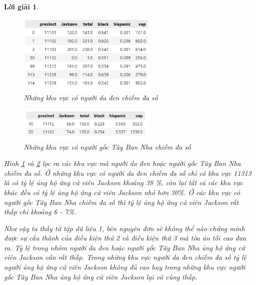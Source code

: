 \documentclass[14pt, a4paper]{article}
\theoremstyle{sltheorem}
\theoremstyle{soltheorem}
\newtheorem*{loigiai}{Lời giải}
\begin{document}
\begin{loigiai}
\begin{enumerate}
    \begin{figure}[H]
        \centering
        \includegraphics[width=0.6\textwidth]{figures/Predominant_black.png}
        \caption{Những khu vực có người da đen chiếm đa số}
        \label{fig:Predominant_black}
    \end{figure}

    \begin{figure}[H]
        \centering
        \includegraphics[width=0.6\textwidth]{figures/Predominant_hispanic.png}
        \caption{Những khu vực có người gốc Tây Ban Nha chiếm đa số}
        \label{fig:Predominant_hispanic}
    \end{figure}

    Hình \ref{fig:Predominant_black} và \ref{fig:Predominant_hispanic} lọc ra các khu vực mà người da đen hoặc người gốc Tây Ban Nha chiếm đa số.
    Ở những khu vực có người da đen chiếm đa số chỉ có khu vực 11313 là có tỷ lệ ủng hộ ứng cử viên Jackson khoảng 38 \%, còn lại tất cả các khu vực khác đều có tỷ lệ ủng hộ ứng cử viên Jackson nhỏ hơn 30\%.
    Ở các khu vực có người gốc Tây Ban Nha chiếm đa số thì tỷ lệ ủng hộ ứng cử viên Jackson rất thấp chỉ khoảng 6 - 7\%.

    Như vậy ta thấy từ tập dữ liệu 1, bên nguyên đơn sẽ không thể nào chứng minh được sự cấu thành của điều kiện thứ 2 và điều kiện thứ 3 mà tòa án tối cao đưa ra.
    Tỷ lệ trong nhóm người da đen hoặc người gốc Tây Ban Nha ủng hộ ứng cứ viên Jackson vẫn rất thấp.
    Trong những khu vực người da đen chiếm đa số tỷ lệ người ủng hộ ứng cử viên Jackson không đủ cao hay trong những khu vực người gốc Tây Ban Nha ủng hộ ứng cử viên Jackson lại vô cùng thấp.


\end{enumerate}
\end{loigiai}
\end{document}

